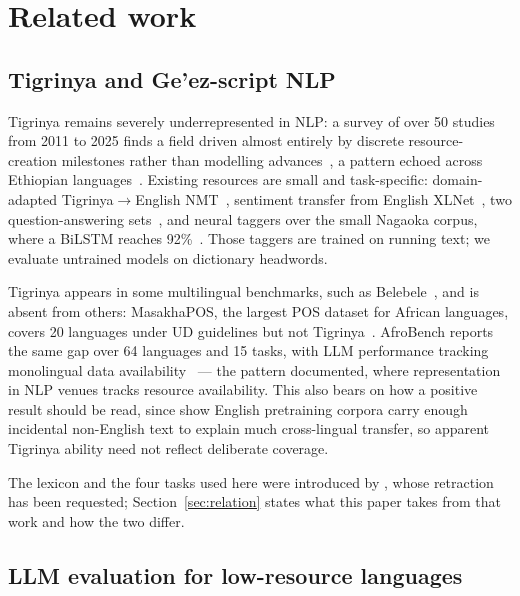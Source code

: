\documentclass[11pt]{article}
\begin{document}
\section{Related work}
\label{sec:related}

\subsection{Tigrinya and Ge'ez-script NLP}

Tigrinya remains severely underrepresented in NLP: a survey of over 50
studies from 2011 to 2025 finds a field driven almost entirely by discrete
resource-creation milestones rather than modelling
advances~\citep{gaim-park-2026-tigrinya}, a pattern echoed across Ethiopian
languages~\citep{tonja-etal-2023-ethiopian}. Existing resources are small
and task-specific: domain-adapted
Tigrinya$\rightarrow$English NMT~\citep{oktem-etal-2020-tigrinya}, sentiment
transfer from English XLNet~\citep{tela-etal-2020-transferring}, two
question-answering sets~\citep{gaim-etal-2023-tiquad,teklehaymanot-etal-2024-tigqa},
and neural taggers over the small Nagaoka corpus, where a BiLSTM reaches
92\%~\citep{tesfagergish-kapociute-2020-pos}. Those taggers are trained on
running text; we evaluate untrained models on dictionary headwords.

Tigrinya appears in some multilingual benchmarks, such as
Belebele~\citep{bandarkar-etal-2024-belebele}, and is absent from others:
MasakhaPOS, the largest POS dataset for African languages, covers 20
languages under UD guidelines but not
Tigrinya~\citep{dione-etal-2023-masakhapos}. AfroBench reports the same gap
over 64 languages and 15 tasks, with LLM performance tracking monolingual
data availability~\citep{ojo-etal-2025-afrobench} --- the pattern
\citet{joshi-etal-2020-state} documented, where representation in NLP venues
tracks resource availability. This also bears on how a positive result
should be read, since \citet{blevins-zettlemoyer-2022-language} show English
pretraining corpora carry enough incidental non-English text to explain much
cross-lingual transfer, so apparent Tigrinya ability need not reflect
deliberate coverage.

The lexicon and the four tasks used here were introduced by
\citet{llmprobe-2026}, whose retraction has been requested;
Section~\ref{sec:relation} states what this paper takes from that work and
how the two differ.

\subsection{LLM evaluation for low-resource languages}
\end{document}
